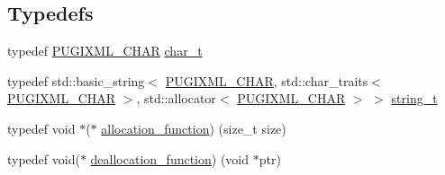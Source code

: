 \subsection*{Typedefs}
\begin{DoxyCompactItemize}
\item 
typedef \hyperlink{pugixml_8hpp_af467437c41f223eaed56106370aa82ff}{P\+U\+G\+I\+X\+M\+L\+\_\+\+C\+H\+AR} \hyperlink{namespacepugi_aef5a7a62cba0507542220ea15afe39df}{char\+\_\+t}
\item 
typedef std\+::basic\+\_\+string$<$ \hyperlink{pugixml_8hpp_af467437c41f223eaed56106370aa82ff}{P\+U\+G\+I\+X\+M\+L\+\_\+\+C\+H\+AR}, std\+::char\+\_\+traits$<$ \hyperlink{pugixml_8hpp_af467437c41f223eaed56106370aa82ff}{P\+U\+G\+I\+X\+M\+L\+\_\+\+C\+H\+AR} $>$, std\+::allocator$<$ \hyperlink{pugixml_8hpp_af467437c41f223eaed56106370aa82ff}{P\+U\+G\+I\+X\+M\+L\+\_\+\+C\+H\+AR} $>$ $>$ \hyperlink{namespacepugi_a053b39a84c8bb031ff3973d1954a876c}{string\+\_\+t}
\item 
typedef void $\ast$($\ast$ \hyperlink{namespacepugi_a7b2d97e5b6040fe323d342268b6ffd4b}{allocation\+\_\+function}) (size\+\_\+t size)
\item 
typedef void($\ast$ \hyperlink{namespacepugi_a3587161b9f8d7ac4ac2d6a45b82462be}{deallocation\+\_\+function}) (void $\ast$ptr)
\end{DoxyCompactItemize}
